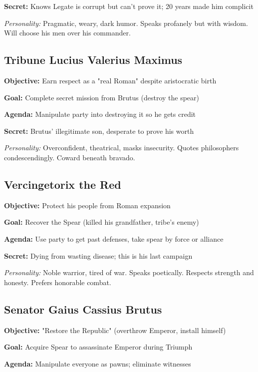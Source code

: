 \documentclass[letterpaper,oneside,twocolumn,openany]{dndbook}
\begin{document}
\textbf{Secret:} Knows Legate is corrupt but can't prove it; 20 years made him complicit

\textit{Personality:} Pragmatic, weary, dark humor. Speaks profanely but with wisdom. Will choose his men over his commander.

\subsection{Tribune Lucius Valerius Maximus}

\textbf{Objective:} Earn respect as a "real Roman" despite aristocratic birth

\textbf{Goal:} Complete secret mission from Brutus (destroy the spear)

\textbf{Agenda:} Manipulate party into destroying it so he gets credit

\textbf{Secret:} Brutus' illegitimate son, desperate to prove his worth

\textit{Personality:} Overconfident, theatrical, masks insecurity. Quotes philosophers condescendingly. Coward beneath bravado.

\subsection{Vercingetorix the Red}

\textbf{Objective:} Protect his people from Roman expansion

\textbf{Goal:} Recover the Spear (killed his grandfather, tribe's enemy)

\textbf{Agenda:} Use party to get past defenses, take spear by force or alliance

\textbf{Secret:} Dying from wasting disease; this is his last campaign

\textit{Personality:} Noble warrior, tired of war. Speaks poetically. Respects strength and honesty. Prefers honorable combat.

\subsection{Senator Gaius Cassius Brutus}

\textbf{Objective:} "Restore the Republic" (overthrow Emperor, install himself)

\textbf{Goal:} Acquire Spear to assassinate Emperor during Triumph

\textbf{Agenda:} Manipulate everyone as pawns; eliminate witnesses
\end{document}
